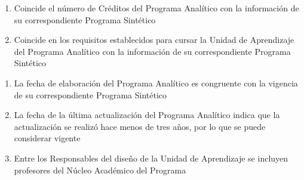 \documentclass{article}
\begin{document}
\begin{Form}
\begin{enumerate}[leftmargin=*,itemsep=-2pt]
\item{Coincide el n\'{u}mero de Cr\'{e}ditos del Programa
  Anal\'{i}tico con la informaci\'{o}n de su correspondiente Programa
  Sint\'{e}tico \begin{flushright}
  \quad
\end{flushright}
}

\item{Coincide en los requisitos establecidos para cursar la Unidad de
  Aprendizaje del Programa Anal\'{i}tico con la informaci\'{o}n de su
  correspondiente Programa Sint\'{e}tico 
\begin{flushright}
    \quad
  \end{flushright}
}
  
\end{enumerate}

\newpage

\begin{enumerate}[resume,leftmargin=*,itemsep=-2pt]

\item{La fecha de elaboraci\'{o}n del Programa Anal\'{i}tico es
  congruente con la vigencia de su correspondiente Programa
  Sint\'{e}tico \begin{flushright}
  \quad
\end{flushright}
}

\item{La fecha de la \'{u}ltima actualizaci\'{o}n del Programa
  Anal\'{i}tico indica que la actualizaci\'{o}n se realiz\'{o} hace
  menos de tres a\~{n}os, por lo que se puede considerar vigente
    \hfill {}%
  \quad%
  }

\item{Entre los Responsables del dise\~{n}o de la Unidad de
  Aprendizaje se incluyen profesores del N\'{u}cleo Acad\'{e}mico del
  Programa \begin{flushright}
  \quad
\end{flushright}
}


\end{enumerate}
\end{Form}
\end{document}
